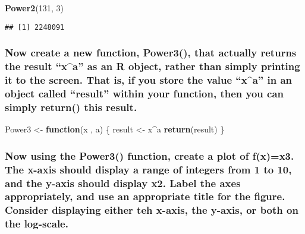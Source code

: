 \documentclass[]{article}
\newenvironment{Shaded}{\begin{snugshade}}{\end{snugshade}}
\newcommand{\KeywordTok}[1]{\textcolor[rgb]{0.13,0.29,0.53}{\textbf{#1}}}
\newcommand{\DecValTok}[1]{\textcolor[rgb]{0.00,0.00,0.81}{#1}}
\newcommand{\StringTok}[1]{\textcolor[rgb]{0.31,0.60,0.02}{#1}}
\newcommand{\ControlFlowTok}[1]{\textcolor[rgb]{0.13,0.29,0.53}{\textbf{#1}}}
\newcommand{\OperatorTok}[1]{\textcolor[rgb]{0.81,0.36,0.00}{\textbf{#1}}}
\newcommand{\NormalTok}[1]{#1}
\begin{document}
\begin{Shaded}
\begin{Highlighting}[]
\KeywordTok{Power2}\NormalTok{(}\DecValTok{131}\NormalTok{, }\DecValTok{3}\NormalTok{)}
\end{Highlighting}
\end{Shaded}

\begin{verbatim}
## [1] 2248091
\end{verbatim}

\subsubsection{\texorpdfstring{Now create a new function, Power3(), that
actually returns the result ``x\^{}a'' as an R object, rather than
simply printing it to the screen. That is, if you store the value
``x\^{}a'' in an object called ``result'' within your function, then you
can simply return() this
result.}{Now create a new function, Power3(), that actually returns the result x\^{}a as an R object, rather than simply printing it to the screen. That is, if you store the value x\^{}a in an object called result within your function, then you can simply return() this result.}}\label{now-create-a-new-function-power3-that-actually-returns-the-result-xa-as-an-r-object-rather-than-simply-printing-it-to-the-screen.-that-is-if-you-store-the-value-xa-in-an-object-called-result-within-your-function-then-you-can-simply-return-this-result.}

\begin{Shaded}
\begin{Highlighting}[]
\NormalTok{Power3 <-}\StringTok{ }\ControlFlowTok{function}\NormalTok{(x , a) \{}
\NormalTok{    result <-}\StringTok{ }\NormalTok{x}\OperatorTok{^}\NormalTok{a}
    \KeywordTok{return}\NormalTok{(result)}
\NormalTok{\}}
\end{Highlighting}
\end{Shaded}

\subsubsection{Now using the Power3() function, create a plot of
f(x)=x3. The x-axis should display a range of integers from 1 to 10, and
the y-axis should display x2. Label the axes appropriately, and use an
appropriate title for the figure. Consider displaying either teh x-axis,
the y-axis, or both on the
log-scale.}\label{now-using-the-power3-function-create-a-plot-of-fxx3.-the-x-axis-should-display-a-range-of-integers-from-1-to-10-and-the-y-axis-should-display-x2.-label-the-axes-appropriately-and-use-an-appropriate-title-for-the-figure.-consider-displaying-either-teh-x-axis-the-y-axis-or-both-on-the-log-scale.}
\end{document}
